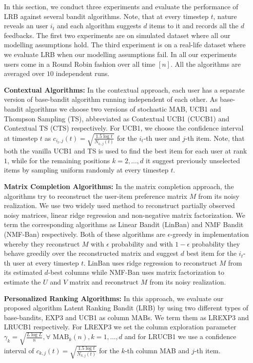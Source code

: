 In this section, we conduct three experiments and evaluate the performance of LRB against several bandit algorithms. Note, that at every timestep $t$, nature reveals an user $i_t$ and each algorithm suggests $d$ items to it and records all the $d$ feedbacks. The first two experiments are on simulated dataset where all our modelling assumptions hold. The third experiment is on a real-life dataset where we evaluate LRB when our modelling assumptions fail. In all our experiments users come in a Round Robin fashion over all time $[n]$. All the algorithms are averaged over $10$ independent runs.

\textbf{Contextual Algorithms:} In the contextual approach, each user has a separate version of base-bandit algorithm running independent of each other. As base-bandit algorithms we choose two versions of stochastic MAB, UCB1 and Thompson Sampling (TS), abbreviated as Contextual UCB1 (CUCB1) and Contextual TS (CTS) respectively. For UCB1, we choose the confidence interval at timestep $t$ as $c_{i_t, j}(t) = \sqrt{\frac{1.5 \log t}{N_{i_t,j}(t)}}$ for the $i_t$-th user and $j$-th item. Note, that both the vanilla UCB1 and TS is used to find the best item for each user at rank $1$, while for the remaining positions $k= 2,\dots, d$ it  suggest previously unselected items by sampling uniform randomly at every timestep $t$. 

\textbf{Matrix Completion Algorithms:} In the matrix completion approach, the algorithms try to reconstruct the user-item preference matrix $M$ from its noisy realization. We use two widely used method to reconstruct partially observed noisy matrices, linear ridge regression and non-negative matrix factorization. We term the corresponding algorithms as Linear Bandit (LinBan) and NMF Bandit (NMF-Ban) respectively. Both of these algorithms are $\epsilon$-greedy in implementation whereby they reconstruct $M$ with $\epsilon$ probability and with $1-\epsilon$ probability they behave greedily over the reconstructed matrix and suggest $d$ best item for the $i_t$-th user at every timestep $t$. LinBan uses ridge regression to reconstruct $M$ from its estimated $d$-best columns while NMF-Ban uses matrix factorization to estimate the $U$ and $V$ matrix and reconstruct $M$ from its noisy realization.

\textbf{Personalized Ranking Algorithms:} In this approach, we evaluate our proposed algorithm Latent Ranking Bandit (LRB) by using two different types of base-bandits, EXP3 and UCB1 as column MABs. We term them as LREXP3 and LRUCB1 respectively. For LREXP3 we set the column exploration parameter $\gamma_k = \sqrt{\frac{L \log L}{n}}, \forall \text{ MAB}_k(n), k = 1,\dots, d$ and for LRUCB1 we use  a confidence interval of $c_{k, j}(t) = \sqrt{\frac{1.5 \log t}{N_{k,j}(t)}}$ for the $k$-th column MAB and $j$-th item.

